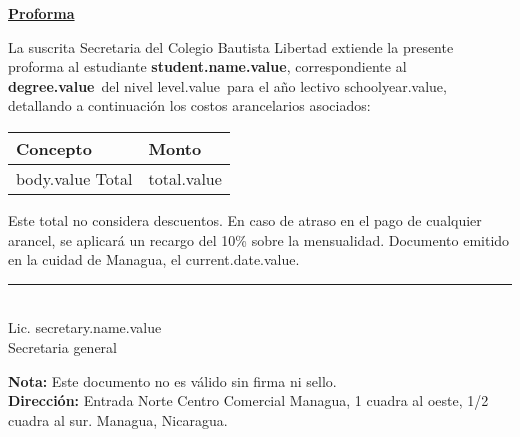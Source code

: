 \documentclass[12pt]{article}
\newcommand{\degreeName}{degree.value}
\newcommand{\levelName}{level.value}
\newcommand{\studentName}{student.name.value}
\newcommand{\schoolYear}{schoolyear.value}
\newcommand{\currentDate}{current.date.value}
\newcommand{\totalAmount}{total.value}
\newcommand{\secretaryName}{secretary.name.value}
\begin{document}
    \begin{center}
        \underline{\textbf{\Large Proforma}}
    \end{center}
    La suscrita Secretaria del Colegio Bautista Libertad extiende la presente proforma al estudiante \textbf{\studentName},
    correspondiente al \textbf{\degreeName}~del nivel \levelName~para el año lectivo \schoolYear, detallando a continuación
    los costos arancelarios asociados:
    \begin{table}[H]
        \centering
        \begin{tabular}{l|l}
            \hline
            Concepto & Monto\\\hline
            body.value \hline
            Total & \totalAmount
        \end{tabular}
    \end{table}
    Este total no considera descuentos.
    En caso de atraso en el pago de cualquier arancel, se aplicará un recargo del 10\% sobre la mensualidad.
    Documento emitido en la cuidad de Managua, el \currentDate.

    \vfill
    \begin{center}
        \rule{5cm}{0.4pt}\\[1mm]
        Lic. \secretaryName\\
        Secretaria general
    \end{center}
    \vfill
    \textbf{Nota:} Este documento no es válido sin firma ni sello.\\
    \textbf{Dirección:} Entrada Norte Centro Comercial Managua, 1 cuadra al oeste, 1/2 cuadra al sur. Managua, Nicaragua.
\end{document}
